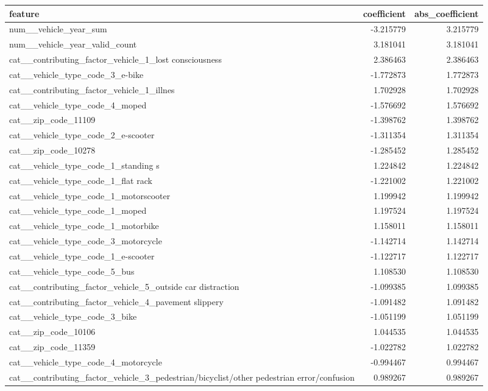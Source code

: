 \begin{tabular}{lrr}
\toprule
feature & coefficient & abs_coefficient \\
\midrule
num__vehicle_year_sum & -3.215779 & 3.215779 \\
num__vehicle_year_valid_count & 3.181041 & 3.181041 \\
cat__contributing_factor_vehicle_1_lost consciousness & 2.386463 & 2.386463 \\
cat__vehicle_type_code_3_e-bike & -1.772873 & 1.772873 \\
cat__contributing_factor_vehicle_1_illnes & 1.702928 & 1.702928 \\
cat__vehicle_type_code_4_moped & -1.576692 & 1.576692 \\
cat__zip_code_11109 & -1.398762 & 1.398762 \\
cat__vehicle_type_code_2_e-scooter & -1.311354 & 1.311354 \\
cat__zip_code_10278 & -1.285452 & 1.285452 \\
cat__vehicle_type_code_1_standing s & 1.224842 & 1.224842 \\
cat__vehicle_type_code_1_flat rack & -1.221002 & 1.221002 \\
cat__vehicle_type_code_1_motorscooter & 1.199942 & 1.199942 \\
cat__vehicle_type_code_1_moped & 1.197524 & 1.197524 \\
cat__vehicle_type_code_1_motorbike & 1.158011 & 1.158011 \\
cat__vehicle_type_code_3_motorcycle & -1.142714 & 1.142714 \\
cat__vehicle_type_code_1_e-scooter & -1.122717 & 1.122717 \\
cat__vehicle_type_code_5_bus & 1.108530 & 1.108530 \\
cat__contributing_factor_vehicle_5_outside car distraction & -1.099385 & 1.099385 \\
cat__contributing_factor_vehicle_4_pavement slippery & -1.091482 & 1.091482 \\
cat__vehicle_type_code_3_bike & -1.051199 & 1.051199 \\
cat__zip_code_10106 & 1.044535 & 1.044535 \\
cat__zip_code_11359 & -1.022782 & 1.022782 \\
cat__vehicle_type_code_4_motorcycle & -0.994467 & 0.994467 \\
cat__contributing_factor_vehicle_3_pedestrian/bicyclist/other pedestrian error/confusion & 0.989267 & 0.989267 \\

\end{tabular}
